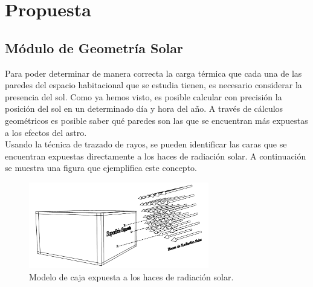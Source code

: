 \section{Propuesta}

\subsection{Módulo de Geometría Solar}
Para poder determinar de manera correcta la carga térmica que cada una de las paredes del espacio habitacional que se estudia tienen, es necesario considerar la presencia del sol. Como ya hemos visto, es posible calcular con precisión la posición del sol en un determinado día y hora del año. A través de cálculos geométricos es posible saber qué paredes son las que se encuentran más expuestas a los efectos del astro. \\

Usando la técnica de trazado de rayos, se pueden identificar las caras que se encuentran expuestas directamente a los haces de radiación solar. A continuación se muestra una figura que ejemplifica este concepto.

\begin{figure}[htbp]
	\centering
	\includegraphics[width=0.7\textwidth, angle=0]{images/sunraysboxmodel.pdf}
	\caption{Modelo de caja expuesta a los haces de radiación solar.}
\end{figure}